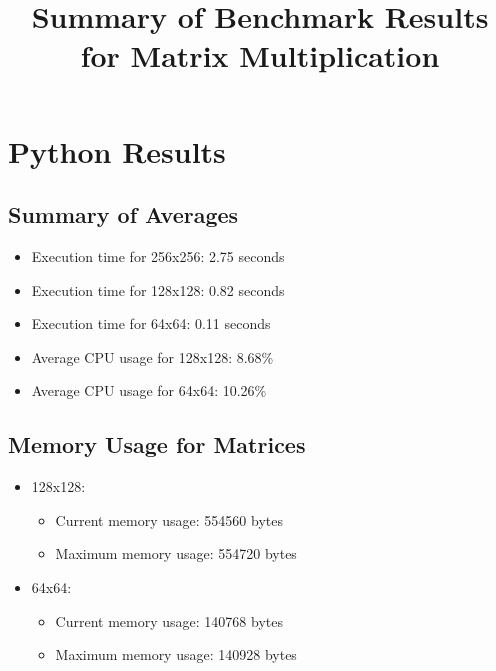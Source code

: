 \documentclass{article}
\begin{document}
\title{Summary of Benchmark Results for Matrix Multiplication}
\author{}
\date{}
\maketitle

\section{Python Results}

\subsection{Summary of Averages}
\begin{itemize}
    \item Execution time for 256x256: 2.75 seconds
    \item Execution time for 128x128: 0.82 seconds
    \item Execution time for 64x64: 0.11 seconds
    \item Average CPU usage for 128x128: 8.68\%
    \item Average CPU usage for 64x64: 10.26\%
\end{itemize}

\subsection{Memory Usage for Matrices}
\begin{itemize}
    \item 128x128:
        \begin{itemize}
            \item Current memory usage: 554560 bytes
            \item Maximum memory usage: 554720 bytes
        \end{itemize}
    \item 64x64:
        \begin{itemize}
            \item Current memory usage: 140768 bytes
            \item Maximum memory usage: 140928 bytes
        \end{itemize}
\end{itemize}
\end{document}
